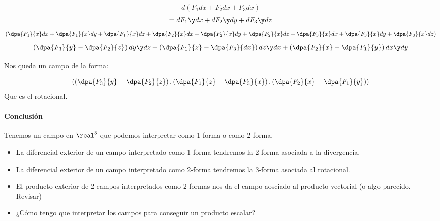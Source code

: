 \[d(F_1 dx + F_2dx+F_3dx)\]
\[ = dF_1\y dx + dF_2 \y dy + dF_3\y dz\]
\[\left(\dpa{F_1}{x}dx + \dpa{F_1}{x}dy + \dpa{F_1}{x}dz +
\dpa{F_2}{x}dx + \dpa{F_2}{x}dy + \dpa{F_2}{x}dz+
\dpa{F_3}{x}dx + \dpa{F_3}{x}dy + \dpa{F_3}{x}dz\right)\]
\[\left(\dpa{F_3}{y} - \dpa{F_2}{z} \right)dy\y dz + \left(\dpa{F_1}{z} - \dpa{F_3}{dx}\right)dz \y dx + \left(\dpa{F_2}{x} - \dpa{F_1}{y}\right) dx \y dy\]

Nos queda un campo de la forma:

\[\left(\left(\dpa{F_3}{y} - \dpa{F_2}{z} \right) ,\left(\dpa{F_1}{z} - \dpa{F_3}{x}\right),\left(\dpa{F_2}{x} - \dpa{F_1}{y}\right)\right)\]
Que es el rotacional.

\paragraph{Conclusión}
Tenemos un campo en $\real^3$ que podemos interpretar como 1-forma o como 2-forma. 

\begin{itemize}
\item La diferencial exterior de un campo interpretado como 1-forma tendremos la 2-forma asociada a la divergencia.

\item La diferencial exterior de un campo interpretado como 2-forma tendremos la 3-forma asociada al rotacional.

\item El producto exterior de 2 campos interpretados como 2-formas nos da el campo aosciado al producto vectorial (o algo parecido. Revisar)

\item ¿Cómo tengo que interpretar los campos para conseguir un producto escalar?

\end{itemize} 


